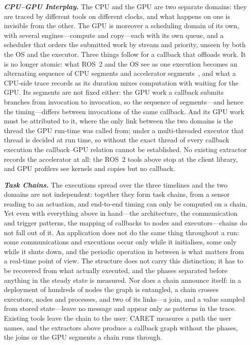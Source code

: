 \noindent
\textit{\textbf{CPU--GPU Interplay.}}
The CPU and the GPU are two separate domains: they are traced by different tools on different clocks, and what happens on one is invisible from the other. The GPU is moreover a scheduling domain of its own, with several engines---compute and copy---each with its own queue, and a scheduler that orders the submitted work by stream and priority, unseen by both the OS and the executor. Three things follow for a callback that offloads work. It is no longer atomic: what ROS~2 and the OS see as one execution becomes an alternating sequence of CPU segments and accelerator segments~\cite{enright-2024-paam}, and what a CPU-side trace records as its duration mixes computation with waiting for the GPU. Its segments are not fixed either: the GPU work a callback submits branches from invocation to invocation, so the sequence of segments---and hence the timing---differs between invocations of the same callback. And its GPU work must be attributed to it, where the only link between the two domains is the thread the GPU run-time was called from; under a multi-threaded executor that thread is decided at run time, so without the exact thread of every callback execution the callback--GPU relation cannot be established. No existing extractor records the accelerator at all: the ROS~2 tools above stop at the client library, and GPU profilers see kernels and copies but no callback.

\noindent
\textit{\textbf{Task Chains.}}
The executions spread over the three timelines and the two domains are not independent: together they form task chains, from a sensor reading to an actuation, and end-to-end timing can only be computed on a chain. Yet even with everything above in hand---the architecture, the communication and trigger patterns, the mapping of callbacks to nodes and executors---chains do not fall out of it. An application does not do the same thing throughout a run: some communications and executions occur only while it initialises, some only while it shuts down, and the periodic operation in between is what matters from a real-time point of view. The structure does not carry this distinction; it has to be recovered from what actually executed, and the phases separated before anything in the steady state is measured. Nor does a chain announce itself: in a deployment of hundreds of nodes the graph is entangled, a chain crosses executors, nodes and processes, and two of its links---a join, and a value sampled from stored state---leave no message and appear only as patterns in the trace. Existing tools leave the chain to the user: CARET measures a path the user names, and the extractors above produce a callback graph without the phases, the joins or the GPU segments a chain runs through.

